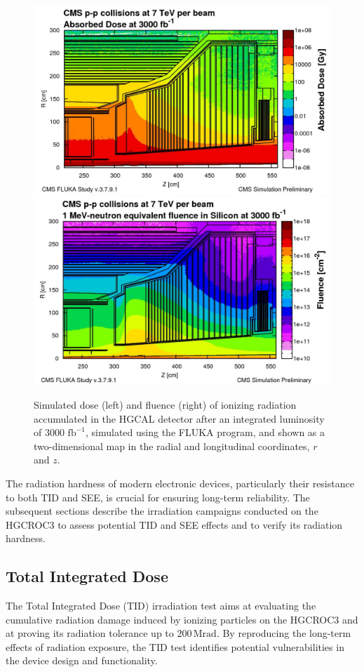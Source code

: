 \begin{figure}
    \centering
    \includegraphics[width=0.49\linewidth]{Figures/HGCAL/HGCALDose.pdf}
    \includegraphics[width=0.49\linewidth]{Figures/HGCAL/HGCALFlux.pdf}
    \caption{Simulated dose (left) and fluence (right) of ionizing radiation accumulated in the HGCAL detector after an integrated luminosity of 3000 $\textrm{fb}^{-1}$, simulated using the FLUKA program, and shown as a two-dimensional map in the radial and longitudinal coordinates, $r$ and $z$.}
    \label{fig:HGCALDose}
\end{figure}

\bigbreak

The radiation hardness of modern electronic devices, particularly their resistance to both TID and SEE, is crucial for ensuring long-term reliability. The subsequent sections describe the irradiation campaigns conducted on the HGCROC3 to assess potential TID and SEE effects and to verify its radiation hardness.


\subsection{Total Integrated Dose}
\label{subsec:Total Integrated Dose} 

The Total Integrated Dose (TID) irradiation test aims at evaluating the cumulative radiation damage induced by ionizing particles on the HGCROC3 and at proving its radiation tolerance up to $200\,\textrm{Mrad}$. By reproducing the long-term effects of radiation exposure, the TID test identifies potential vulnerabilities in the device design and functionality.


